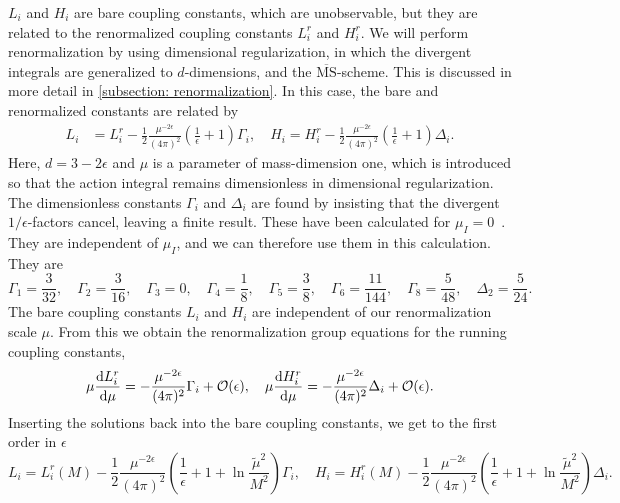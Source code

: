 $L_i$ and $H_i$  are bare coupling constants, which are unobservable, but they are related to the renormalized coupling constants $L_i^r$ and $H_i^r$.
We will perform renormalization by using dimensional regularization, in which the divergent integrals are generalized to $d$-dimensions, and the $\overline{\mathrm{MS}}$-scheme.
This is discussed in more detail in \autoref{subsection: renormalization}.
In this case, the bare and renormalized constants are related by
%
\begin{align}
    L_i 
    & = 
    L_i^r 
    -
    \frac{1}{2} \frac{\mu^{-2\epsilon}} {(4 \pi)^2}
    \left(\frac{1}{\epsilon} + 1 \right) \Gamma_i, \quad
    H_i = 
    H_i^r
    -  \frac{1}{2}  \frac{\mu^{-2\epsilon}}{(4 \pi)^2} 
    \left(\frac{1}{\epsilon} + 1 \right) \Delta_i .
\end{align}
%
Here, $d = 3 - 2\epsilon$ and $\mu$ is a parameter of mass-dimension one, which is introduced so that the action integral remains dimensionless in dimensional regularization.
The dimensionless constants $\Gamma_i$ and $\Delta_i$ are found by insisting that the divergent $1/\epsilon$-factors cancel, leaving a finite result.
These have been calculated for $\mu_I = 0$~\autocite{gasserChiralPerturbationTheory1985}.
They are independent of $\mu_I$, and we can therefore use them in this calculation.
They are
\begin{equation}
    \Gamma_1 = \frac{3}{32}, \quad
    \Gamma_2 = \frac{3}{16}, \quad
    \Gamma_3 = 0, \quad
    \Gamma_4 = \frac{1}{8}, \quad
    \Gamma_5 = \frac{3}{8}, \quad
    \Gamma_6 = \frac{11}{144}, \quad
    \Gamma_8 = \frac{5}{48}, \quad
    \Delta_2 = \frac{5}{24}.
\end{equation}
%
The bare coupling constants $L_i$ and $H_i$ are independent of our renormalization scale $\mu$.
From this we obtain the renormalization group equations for the running coupling constants,
\begin{equation}
    \mu \diff{L_i^r}{\mu } 
    = - \frac{  \mu^{-2\epsilon} }{(4 \pi)^2} \Gamma_i + \mathcal{O}(\epsilon), \quad
    \mu \diff{H_i^r}{\mu } 
    = - \frac{ \mu^{-2\epsilon}}{(4 \pi)^2} \Delta_i + \mathcal{O}(\epsilon).
\end{equation}
%
Inserting the solutions back into the bare coupling constants, we get to the first order in $\epsilon$
%
\begin{equation}
    L_i
    = 
    L_i^r(M)
    - \frac{1}{2} \frac{\mu^{-2\epsilon}} {(4 \pi)^2}
    \left(\frac{1}{\epsilon} + 1 + \ln{\frac{\tilde \mu^2}{M^2}}\right) \Gamma_i,
    \quad
    H_i
    = 
    H_i^r (M)
    - \frac{1}{2} \frac{\mu^{-2\epsilon}} {(4 \pi)^2}
    \left(\frac{1}{\epsilon} + 1 + \ln{\frac{\tilde \mu^2}{M^2}}\right) \Delta_i.
\end{equation}

